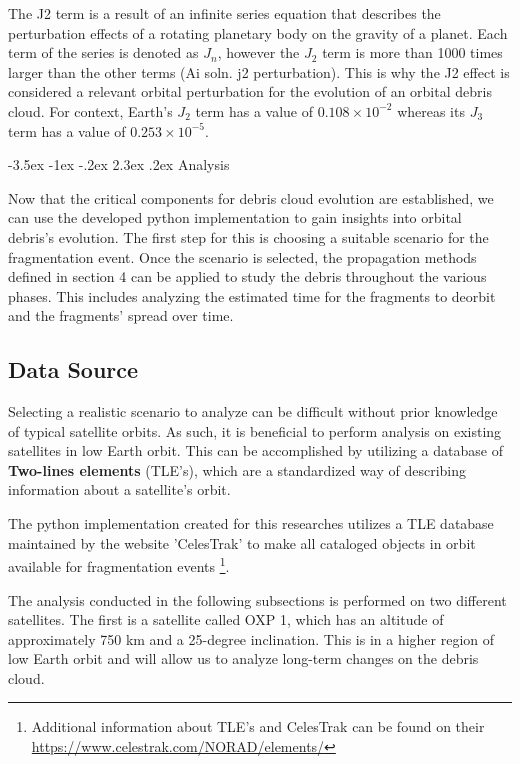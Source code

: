 \documentclass[a4paper, 12pt]{article}
\makeatletter
\renewcommand\section{\clearpage\newpage\@startsection {section}{1}{\z@}%
	{-3.5ex \@plus -1ex \@minus -.2ex}%
	{2.3ex \@plus.2ex}%
	{\normalfont\Large\bfseries}}
\newcommand{\boldindex}[1]{%
	\textbf{#1}\index{#1}%
}
\makeatother
\begin{document}
The J2 term is a result of an infinite series equation that describes the perturbation effects of a rotating planetary body on the gravity of a planet. Each term of the series is denoted as $J_n$, however the $J_2$ term is more than 1000 times larger than the other terms (Ai soln. j2 perturbation). This is why the J2 effect is considered a relevant orbital perturbation for the evolution of an orbital debris cloud. For context, Earth's  $J_2$ term has a value of $0.108 \times 10^{-2}$ whereas its $J_3$ term has a value of $0.253 \times 10^{-5}$.

\section{Analysis}

Now that the critical components for debris cloud evolution are established, we can use the developed python implementation to gain insights into orbital debris's evolution. The first step for this is choosing a suitable scenario for the fragmentation event. Once the scenario is selected, the propagation methods defined in section 4 can be applied to study the debris throughout the various phases. This includes analyzing the estimated time for the fragments to deorbit and the fragments' spread over time.

\subsection{Data Source}
Selecting a realistic scenario to analyze can be difficult without prior knowledge of typical satellite orbits. As such, it is beneficial to perform analysis on existing satellites in low Earth orbit. This can be accomplished by utilizing a database of \boldindex{Two-lines elements} (TLE's), which are a standardized way of describing information about a satellite's orbit.

The python implementation created for this researches utilizes a TLE database maintained by the website 'CelesTrak' to make all cataloged objects in orbit available for fragmentation events \footnote{Additional information about TLE's and CelesTrak can be found on their \href{URL}{https://www.celestrak.com/NORAD/elements/}}.

The analysis conducted in the following subsections is performed on two different satellites. The first is a satellite called OXP 1, which has an altitude of approximately 750 km and a 25-degree inclination. This is in a higher region of low Earth orbit and will allow us to analyze long-term changes on the debris cloud.
\end{document}
